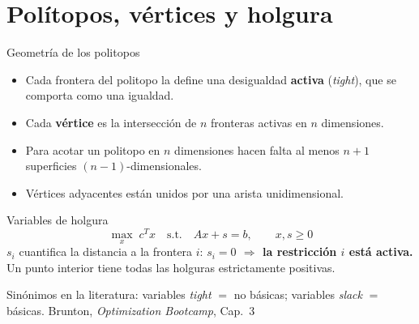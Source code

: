 \documentclass[10pt,aspectratio=169]{beamer}
\newcommand{\fuente}{\vfill{\scriptsize\color{gray}Brunton, \emph{Optimization Bootcamp}, Cap.~3}}
\begin{document}
\section{Polítopos, vértices y holgura}

\begin{frame}{Geometría de los politopos}
  \small
  \begin{itemize}
    \item Cada frontera del politopo la define una desigualdad \textbf{activa}
      (\emph{tight}), que se comporta como una igualdad.
    \item Cada \textbf{vértice} es la intersección de $n$ fronteras activas en $n$ dimensiones.
    \item Para acotar un politopo en $n$ dimensiones hacen falta al menos $n+1$
      superficies $(n-1)$-dimensionales.
    \item Vértices adyacentes están unidos por una arista unidimensional.
  \end{itemize}
  \begin{block}{Variables de holgura}
    \[
      \max_x\; c^T x \quad \text{s.t.}\quad Ax + s = b,\qquad x, s \ge 0
    \]
    $s_i$ cuantifica la distancia a la frontera $i$:
    \textbf{$s_i = 0$ $\Rightarrow$ la restricción $i$ está activa.}
    Un punto interior tiene todas las holguras estrictamente positivas.
  \end{block}
  \vfill
  {\scriptsize\color{gray}
    Sinónimos en la literatura: variables \emph{tight} $=$ no básicas;
    variables \emph{slack} $=$ básicas.}
  \fuente
\end{frame}
\end{document}
